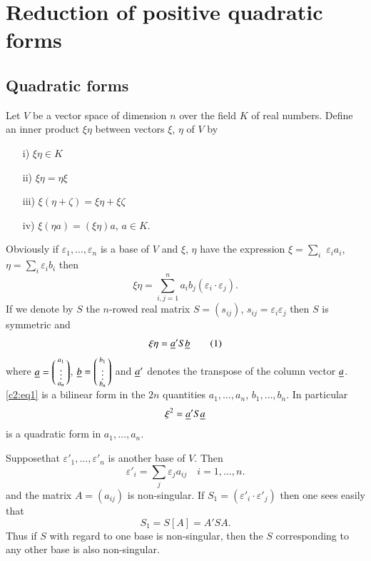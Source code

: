 \chapter{Reduction of positive quadratic forms}\label{chap2}

\section{Quadratic forms}\label{chap2:sec1}\pageoriginale

Let $V$ be a vector space of dimension $n$ over the field $K$ of real
numbers. Define an inner product $\xi\eta$ between vectors $\xi$,
$\eta$ of $V$ by 
\begin{itemize}
\item[i)] $\xi\eta\in K$

\item[ii)] $\xi\eta=\eta\xi$

\item[iii)] $\xi(\eta+\zeta)=\xi\eta+\xi\zeta$

\item[iv)] $\xi(\eta a)=(\xi\eta)a$, $a\in K$.
\end{itemize}
Obviously if $\varepsilon_{1},\ldots,\varepsilon_{n}$ is a base of $V$ and
$\xi$, $\eta$ have the expression $\xi=\sum\limits_{i}$ $\varepsilon_i
a_{i}$, $\eta=\sum\limits_{i}\varepsilon_{i}b_{i}$ then
$$
\xi\eta=\sum^{n}_{i,j=1}a_{i}b_{j}(\varepsilon_{i}\cdot \varepsilon_{j}).
$$
If we denote by $S$ the $n$-rowed real matrix $S=(s_{ij})$,
$s_{ij}=\varepsilon_{i}\varepsilon_{j}$ then $S$ is symmetric and 
\begin{equation*}
\xi\eta=\underline{a}'S\underline{b}\tag{1}\label{c2:eq1}
\end{equation*}
where $\underline{a}=\left(\begin{smallmatrix} a_{1}\\ \vdots\\ a_{n}
\end{smallmatrix} \right)$, $\underline{b}=
\left(\begin{smallmatrix}b_{1}\\ \vdots\\ b_{n} 
\end{smallmatrix} \right)$ and $\underline{a}'$ denotes the transpose of the column
vector $\underline{a}$. \eqref{c2:eq1} is a bilinear form in the $2n$ quantities
$a_{1},\ldots,a_{n}$, $b_{1},\ldots,b_{n}$. In particular
$$
\xi^{2}=\underline{a}'S\underline{a}
$$
is a quadratic form in $a_{1},\ldots,a_{n}$.

Suppose\pageoriginale that $\varepsilon'_{1},\ldots,\varepsilon'_{n}$ is
another base of $V$. Then
$$
\varepsilon'_{i}=\sum_{j}\varepsilon_{j}a_{ij}\quad i=1,\ldots,n.
$$
and the matrix $A=(a_{ij})$ is non-singular. If
$S_{1}=(\varepsilon'_{i}\cdot\varepsilon'_{j})$ then one sees easily that
$$
S_{1}=S[A]=A'SA.
$$
Thus if $S$ with regard to one base is non-singular, then the $S$
corresponding to any other base is also non-singular.

